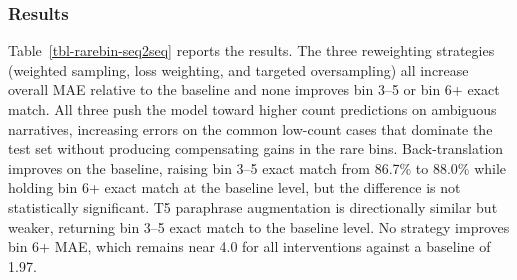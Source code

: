 \documentclass[
  11pt,
]{article}
\begin{document}
\subsubsection{Results}\label{results}

\begin{table}

\caption{\label{tbl-rarebin-seq2seq}Seq2seq rare-bin intervention
results (Flan-T5-Large base).}


\end{table}%

Table~\ref{tbl-rarebin-seq2seq} reports the results. The three
reweighting strategies (weighted sampling, loss weighting, and targeted
oversampling) all increase overall MAE relative to the baseline and none
improves bin 3--5 or bin 6+ exact match. All three push the model toward
higher count predictions on ambiguous narratives, increasing errors on
the common low-count cases that dominate the test set without producing
compensating gains in the rare bins. Back-translation improves on the
baseline, raising bin 3--5 exact match from 86.7\% to 88.0\% while
holding bin 6+ exact match at the baseline level, but the difference is
not statistically significant. T5 paraphrase augmentation is
directionally similar but weaker, returning bin 3--5 exact match to the
baseline level. No strategy improves bin 6+ MAE, which remains near 4.0
for all interventions against a baseline of 1.97.
\end{document}
